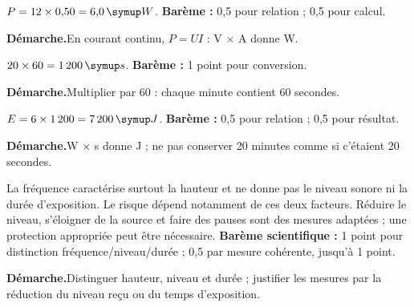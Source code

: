 \par\noindent\begin{minipage}{\linewidth}
$P=12\times0{,}50=6{,}0\unite W$. \textbf{Barème :} 0,5 pour relation ; 0,5 pour calcul.\par
\smallskip\noindent\textbf{Démarche.}\enspace En courant continu, $P=UI$ : V × A donne W.\par
\end{minipage}\par
\par\noindent\begin{minipage}{\linewidth}
$20\times60=1\,200\unite s$. \textbf{Barème :} 1 point pour conversion.\par
\smallskip\noindent\textbf{Démarche.}\enspace Multiplier par 60 : chaque minute contient 60 secondes.\par
\end{minipage}\par
\par\noindent\begin{minipage}{\linewidth}
$E=6\times1\,200=7\,200\unite J$. \textbf{Barème :} 0,5 pour relation ; 0,5 pour résultat.\par
\smallskip\noindent\textbf{Démarche.}\enspace W × s donne J ; ne pas conserver 20 minutes comme si c’étaient 20 secondes.\par
{}
\end{minipage}\par
\par\noindent\begin{minipage}{\linewidth}
La fréquence caractérise surtout la hauteur et ne donne pas le niveau sonore ni la durée d’exposition. Le risque dépend notamment de ces deux facteurs. Réduire le niveau, s’éloigner de la source et faire des pauses sont des mesures adaptées ; une protection appropriée peut être nécessaire. \textbf{Barème scientifique :} 1 point pour distinction fréquence/niveau/durée ; 0,5 par mesure cohérente, jusqu’à 1 point.\par
\smallskip\noindent\textbf{Démarche.}\enspace Distinguer hauteur, niveau et durée ; justifier les mesures par la réduction du niveau reçu ou du temps d’exposition.\par
\end{minipage}\par
